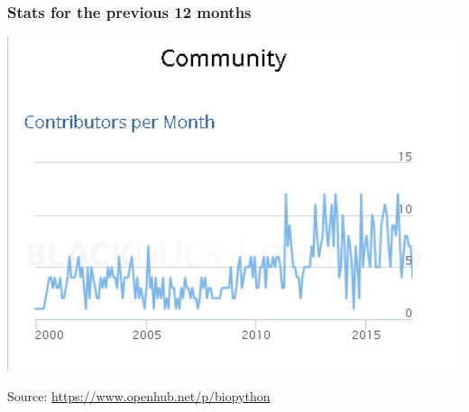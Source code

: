 \documentclass[trans]{beamer}
\begin{document}
{
  \frametitle{Stats for the previous 12 months}

  \begin{center}
  \includegraphics[width=1.0\textwidth]{openhub-bp-community-activity.png}
  \end{center}
  \small{Source: \url{https://www.openhub.net/p/biopython}}
}
\frame
\end{document}
